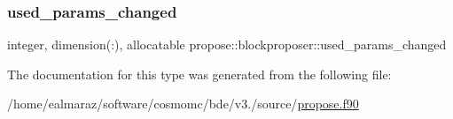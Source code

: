 \mbox{\label{structpropose_1_1blockproposer_ae78953989ed2fba841ae7b5caad4ebc9}} 
\subsubsection{\texorpdfstring{used\+\_\+params\+\_\+changed}{used\_params\_changed}}
{\footnotesize\ttfamily integer, dimension(\+:), allocatable propose\+::blockproposer\+::used\+\_\+params\+\_\+changed}



The documentation for this type was generated from the following file\+:\begin{DoxyCompactItemize}
\item 
/home/ealmaraz/software/cosmomc/bde/v3./source/\mbox{\hyperlink{propose_8f90}{propose.\+f90}}\end{DoxyCompactItemize}
